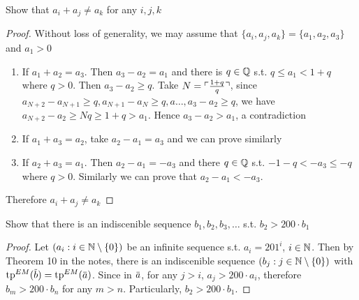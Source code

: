 \documentclass[11pt]{article}
\begin{document}
\begin{exercise}
Show that \(a_i+a_j\neq a_k\) for any \(i,j,k\)
\end{exercise}

\begin{proof}
Without loss of generality, we may assume that \(\{a_i,a_j,a_k\}=\{a_1,a_2,a_3\}\) and \(a_1>0\)
\begin{enumerate}
\item If \(a_1+a_2=a_3\). Then \(a_3-a_2=a_1\) and there is \(q\in\mathbb{Q}\) s.t. \(q\le a_1< 1+q\) where \(q>0\).
Then \(a_3-a_2\ge q\). Take \(N=\ulcorner \frac{1+q}{q} \urcorner\),
since \(a_{N+2}-a_{N+1}\ge q,a_{N+1}-a_N\ge q,a\dots,a_3-a_2\ge q\), we have \(a_{N+2}-a_2\ge Nq\ge 1+q> a_1\).
Hence \(a_3-a_2> a_1\), a contradiction
\item If \(a_1+a_3=a_2\), take \(a_2-a_1=a_3\) and we can prove similarly
\item If \(a_2+a_3=a_1\). Then \(a_2-a_1=-a_3\) and there \(q\in\mathbb{Q}\) s.t. \(-1-q<-a_3\le -q\) where \(q>0\).
Similarly we can prove that \(a_2-a_1<-a_3\).
\end{enumerate}


Therefore \(a_i+a_j\neq a_k\)
\end{proof}

\begin{exercise}
Show that there is an indiscenible sequence \(b_1,b_2,b_3,\dots\) s.t. \(b_2>200\cdot b_1\)
\end{exercise}

\begin{proof}
Let \((a_i:i\in\mathbb{N}\setminus\{0\})\) be an infinite sequence s.t. \(a_i=201^i\), \(i\in\mathbb{N}\). Then by Theorem 10 in the notes,
there is an indiscenible sequence \((b_j:j\in\mathbb{N}\setminus\{0\})\) with \(\tp^{EM}(\barb)=\tp^{EM}(\bara)\). Since
in \(\bara\), for any \(j>i\), \(a_j>200\cdot a_i\), therefore \(b_m>200\cdot b_n\) for any \(m>n\).
Particularly, \(b_2>200\cdot b_1\).
\end{proof}
\end{document}
